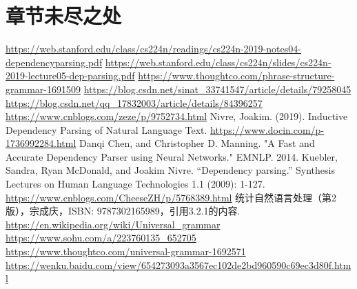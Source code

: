\section*{章节未尽之处}

\begin{thebibliography}{本章节参考文献\&阅读材料}
 \url{https://web.stanford.edu/class/cs224n/readings/cs224n-2019-notes04-dependencyparsing.pdf}
 \url{https://web.stanford.edu/class/cs224n/slides/cs224n-2019-lecture05-dep-parsing.pdf}
 \url{https://www.thoughtco.com/phrase-structure-grammar-1691509}
 \url{https://blog.csdn.net/sinat_33741547/article/details/79258045}
 \url{https://blog.csdn.net/qq_17832003/article/details/84396257}
 \url{https://www.cnblogs.com/zeze/p/9752734.html}
 Nivre, Joakim. (2019). Inductive Dependency Parsing of Natural Language Text. 
 \url{https://www.docin.com/p-1736992284.html}
 Danqi Chen, and Christopher D. Manning. "A Fast and Accurate Dependency Parser using Neural Networks." EMNLP. 2014.
 Kuebler, Sandra, Ryan McDonald, and Joakim Nivre. “Dependency parsing.” Synthesis Lectures on Human Language Technologies 1.1 (2009): 1-127.
 \url{https://www.cnblogs.com/CheeseZH/p/5768389.html}
 统计自然语言处理（第2版），宗成庆，ISBN: 9787302165989，引用3.2.1的内容.
 \url{https://en.wikipedia.org/wiki/Universal_grammar}
 \url{https://www.sohu.com/a/223760135_652705}
 \url{https://www.thoughtco.com/universal-grammar-1692571}
 \url{https://wenku.baidu.com/view/654273093a3567ec102de2bd960590c69ec3d80f.html}
\end{thebibliography}


